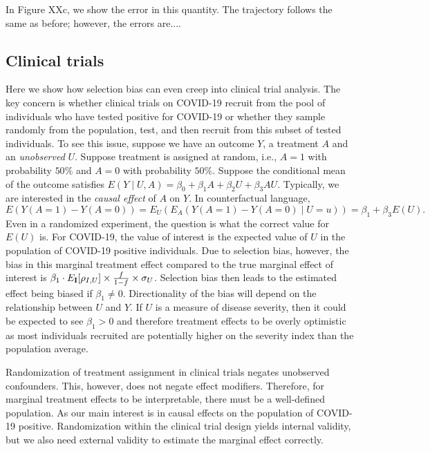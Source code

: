 \documentclass[11pt]{amsart}
\def\I{\bf I}
\begin{document}
In Figure XXc, we show the error in this quantity.  The trajectory follows the same as before; however, the errors are....

\subsection{Clinical trials}

Here we show how selection bias can even creep into clinical trial analysis. The key concern is whether clinical trials on COVID-19 recruit from the pool of individuals who have tested positive for COVID-19 or whether they sample randomly from the population, test, and then recruit from this subset of tested individuals.  To see this issue, suppose we have an outcome $Y$, a treatment $A$ and an \emph{unobserved} $U$.  Suppose treatment is assigned at random, i.e., $A =1$ with probability $50\%$ and $A=0$ with probability $50\%$.  Suppose the conditional mean of the outcome satisfies  $E(Y \mid U, A ) = \beta_0 + \beta_1 A + \beta_2 U + \beta_3 A U$.  Typically, we are interested in the \emph{causal effect} of $A$ on $Y$.  In counterfactual language,
$$
E( Y(A=1) - Y(A=0) ) = E_U ( E_A ( Y(A=1) - Y(A=0) \mid U=u ))
= \beta_1 + \beta_3 E(U).
$$
Even in a randomized experiment, the question is what the correct value for $E(U)$ is. For COVID-19, the value of interest is the expected value of $U$ in the population of COVID-19 positive individuals.  Due to selection bias, however, the bias in this marginal treatment effect compared to the true marginal effect of interest is $\beta_1 \cdot E_{\I} [ \rho_{I,U} ] \times \frac{f}{1-f} \times \sigma_U$.  Selection bias then leads to the estimated effect being biased if $\beta_1 \neq 0$.  Directionality of the bias will depend on the relationship between $U$ and $Y$.  If $U$ is a measure of disease severity, then it could be expected to see $\beta_1 > 0$ and therefore treatment effects to be overly optimistic as most individuals recruited are potentially higher on the severity index than the population average.

Randomization of treatment assignment in clinical trials negates unobserved confounders.  This, however, does not negate effect modifiers.  Therefore, for marginal treatment effects to be interpretable, there must be a well-defined population.  As our main interest is in causal effects on the population of COVID-19 positive.  Randomization within the clinical trial design yields internal validity, but we also need external validity to estimate the marginal effect correctly.
\end{document}
